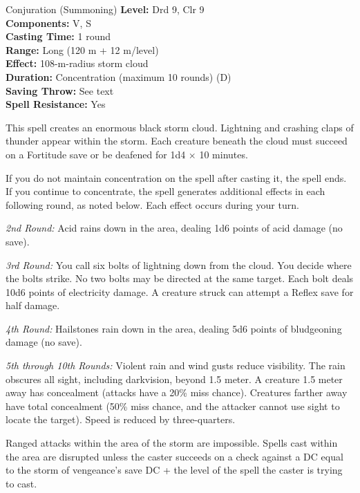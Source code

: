 {Conjuration (Summoning)}
{
	\textbf{Level:}
	Drd 9, Clr 9\\
	\textbf{Components:}
	V, S\\
	\textbf{Casting Time:}
	1 round\\
	\textbf{Range:}
	Long (120 m + 12 m/level)\\
	\textbf{Effect:}
	108-m-radius storm cloud\\
	\textbf{Duration:}
	Concentration (maximum 10 rounds) (D)\\
	\textbf{Saving Throw:}
	See text\\
	\textbf{Spell Resistance:}
	Yes\\
}
{
	This spell creates an enormous black storm cloud. Lightning and crashing claps of thunder appear within the storm. Each creature beneath the cloud must succeed on a Fortitude save or be deafened for 1d4 $\times$ 10 minutes.

	If you do not maintain concentration on the spell after casting it, the spell ends.  If you continue to concentrate, the spell generates additional effects in each following round, as noted below. Each effect occurs during your turn.

	\textit{2nd Round:}
	Acid rains down in the area, dealing 1d6 points of acid damage (no save).

	\textit{3rd Round:}
	You call six bolts of lightning down from the cloud. You decide where the bolts strike. No two bolts may be directed at the same target. Each bolt deals 10d6 points of electricity damage. A creature struck can attempt a Reflex save for half damage.

	\textit{4th Round:}
	Hailstones rain down in the area, dealing 5d6 points of bludgeoning damage (no save).

	\textit{5th through 10th Rounds:}
	Violent rain and wind gusts reduce visibility. The rain obscures all sight, including darkvision, beyond 1.5 meter. A creature 1.5 meter away has concealment (attacks have a 20\% miss chance). Creatures farther away have total concealment (50\% miss chance, and the attacker cannot use sight to locate the target). Speed is reduced by three-quarters.

	Ranged attacks within the area of the storm are impossible. Spells cast within the area are disrupted unless the caster succeeds on a  check against a DC equal to the storm of vengeance's save DC + the level of the spell the caster is trying to cast.

}
